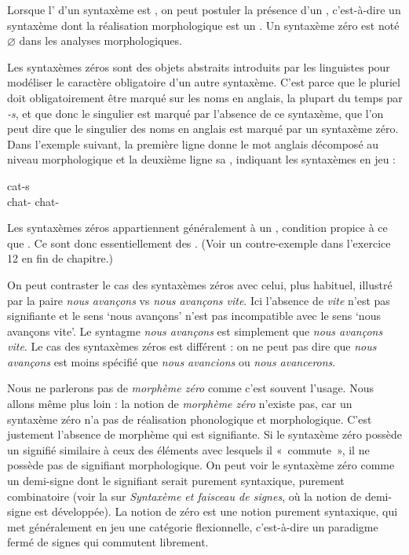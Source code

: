 {Lorsque l’ d’un syntaxème est , on peut postuler la présence d’un , c’est-à-dire un syntaxème dont la réalisation morphologique est un . Un syntaxème zéro est noté ${\varnothing}$ dans les analyses morphologiques.}

Les syntaxèmes zéros sont des objets abstraits introduits par les linguistes pour modéliser le caractère obligatoire d’un autre syntaxème. C’est parce que le pluriel doit obligatoirement être marqué sur les noms en anglais, la plupart du temps par \textit{{}-s}, et que donc le singulier est marqué par l’absence de ce syntaxème, que l’on peut dire que le singulier des noms en anglais est marqué par un syntaxème zéro. Dans l’exemple suivant, la première ligne donne le mot anglais décomposé au niveau morphologique et la deuxième ligne sa , indiquant les syntaxèmes en jeu :

\ea
{}  \hspace{1em}  {cat-s}\\
      {chat-\SG}  {}  {chat-\PL}\\
\z

Les syntaxèmes zéros appartiennent généralement à un , condition propice à ce que  . Ce sont donc essentiellement des . (Voir un contre-exemple dans l'exercice 12 en fin de chapitre.)

On peut contraster le cas des syntaxèmes zéros avec celui, plus habituel, illustré par la paire \textit{nous avançons} vs \textit{nous avançons vite}. Ici l’absence de \textit{vite} n’est pas signifiante et le sens ‘nous avançons’ n’est pas incompatible avec le sens ‘nous avançons vite’. Le syntagme \textit{nous avançons} est simplement  que \textit{nous avançons vite}. Le cas des syntaxèmes zéros est différent : on ne peut pas dire que \textit{nous avançons} est moins spécifié que \textit{nous avancions} ou \textit{nous avancerons}.

Nous ne parlerons pas de \textit{morphème zéro} comme c’est souvent l’usage. Nous allons même plus loin : la notion de \textit{morphème zéro} n’existe pas, car un syntaxème zéro n’a pas de réalisation phonologique et morphologique. C’est justement l’absence de morphème qui est signifiante. Si le syntaxème zéro possède un signifié similaire à ceux des éléments avec lesquels il «~commute~», il ne possède pas de signifiant morphologique. On peut voir le syntaxème zéro comme un demi-signe dont le signifiant serait purement syntaxique, purement combinatoire (voir la  sur \textit{Syntaxème et faisceau de signes}, où la notion de demi-signe est développée). La notion de zéro est une notion purement syntaxique, qui met généralement en jeu une catégorie flexionnelle, c’est-à-dire un paradigme fermé de signes qui commutent librement.


